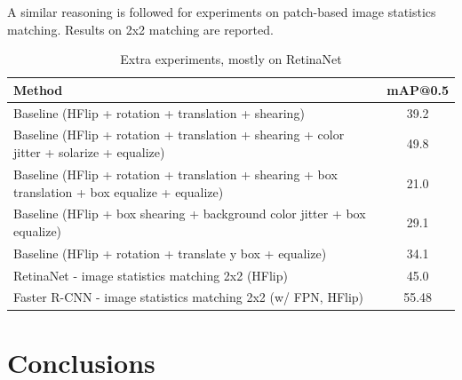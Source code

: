 \documentclass[%
    corpo=12pt,
    twoside,
    stile=classica,   
    tipotesi=magistrale,
    evenboxes,
    english,
	numerazioneromana,
]{toptesi}
\begin{document}
A similar reasoning is followed for experiments on patch-based image statistics matching. Results on 2x2 matching are reported.

\begin{table}[ht!]
	\centering
	\begin{tabularx}{\linewidth}{|X|c|}
		\hline
		Method  &   mAP@0.5 \\
		\hline\hline
		Baseline (HFlip + rotation + translation + shearing)      &   39.2   \\
		\hline
		Baseline (HFlip + rotation + translation + shearing + color jitter + solarize + equalize)      &   49.8   \\
		\hline
		Baseline (HFlip + rotation + translation + shearing + box translation + box equalize + equalize)      &   21.0   \\
		\hline
		Baseline (HFlip + box shearing + background color jitter + box equalize)      &   29.1   \\
		\hline
		Baseline (HFlip + rotation + translate y box + equalize)      &   34.1   \\
		\hline
		RetinaNet - image statistics matching 2x2 (HFlip) &   45.0    \\
		\hline
		Faster R-CNN - image statistics matching 2x2 (w/ FPN, HFlip) &   55.48    \\
		\hline
	\end{tabularx}
	\caption{Extra experiments, mostly on RetinaNet}
	\label{table:extra}
\end{table}

\chapter{Conclusions}


\backmatter
\english
\printbibliography[heading=bibintoc]
\end{document}
